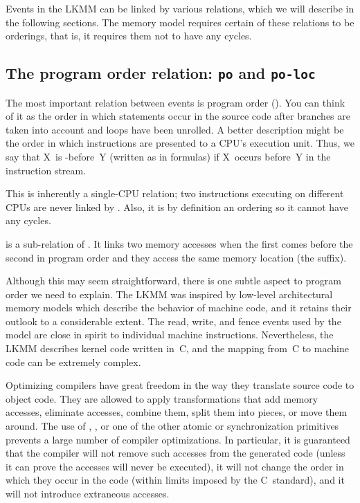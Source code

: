 Events in the LKMM can be linked by various relations, which we will
describe in the following sections.
The memory model requires certain of these relations to be orderings,
that is, it requires them not to have any cycles.


\subsection{The program order relation: \texttt{po} and \texttt{po-loc}}
\label{sec:docs:explanation:The program order relation: po and po-loc}

The most important relation between events is program order ().
You can think of it as the order in which statements occur in the source
code after branches are taken into account and loops have been
unrolled.
A better description might be the order in which instructions are
presented to a CPU's execution unit.
Thus, we say that X~is -before~Y (written as  in
formulas) if X~occurs before~Y in the instruction stream.

This is inherently a single-CPU relation; two instructions executing
on different CPUs are never linked by .
Also, it is by definition an ordering so it cannot have any cycles.

 is a sub-relation of .
It links two memory accesses when the first comes before the second
in program order and they access the same memory location (the 
suffix).

Although this may seem straightforward, there is one subtle aspect to
program order we need to explain.
The LKMM was inspired by low-level architectural memory models which
describe the behavior of machine code, and it retains their outlook
to a considerable extent.
The read, write, and fence events used by the model are close in spirit
to individual machine instructions.
Nevertheless, the LKMM describes kernel code written in~C, and the
mapping from~C to machine code can be extremely complex.

Optimizing compilers have great freedom in the way they translate
source code to object code.
They are allowed to apply transformations that add memory accesses,
eliminate accesses, combine them, split them into pieces, or move them
around.
The use of , , or one of the other
atomic or synchronization primitives prevents a large number of
compiler optimizations.
In particular, it is guaranteed that the compiler will not remove such
accesses from the generated code (unless it can prove the accesses will
never be executed), it will not change the order in which they occur
in the code (within limits imposed by the C~standard), and it will not
introduce extraneous accesses.

